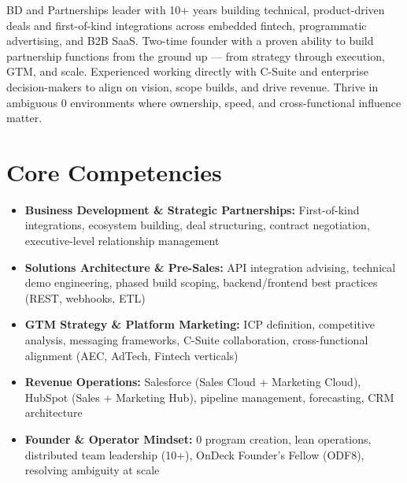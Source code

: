 \documentclass[11pt,a4paper,sans]{moderncv}
\begin{document}
\makecvtitle


\vspace{6pt}
\small{BD and Partnerships leader with 10+ years building technical, product-driven deals and first-of-kind integrations across embedded fintech, programmatic advertising, and B2B SaaS. Two-time founder with a proven ability to build partnership functions from the ground up — from strategy through execution, GTM, and scale. Experienced working directly with C-Suite and enterprise decision-makers to align on vision, scope builds, and drive revenue. Thrive in ambiguous 0 environments where ownership, speed, and cross-functional influence matter.}


\section{Core Competencies}
\vspace{1pt}
\begin{itemize}

\item \textbf{Business Development \& Strategic Partnerships:} First-of-kind integrations, ecosystem building, deal structuring, contract negotiation, executive-level relationship management
\vspace{1pt}

\item \textbf{Solutions Architecture \& Pre-Sales:} API integration advising, technical demo engineering, phased build scoping, backend/frontend best practices (REST, webhooks, ETL)
\vspace{1pt}

\item \textbf{GTM Strategy \& Platform Marketing:} ICP definition, competitive analysis, messaging frameworks, C-Suite collaboration, cross-functional alignment (AEC, AdTech, Fintech verticals)
\vspace{1pt}

\item \textbf{Revenue Operations:} Salesforce (Sales Cloud + Marketing Cloud), HubSpot (Sales + Marketing Hub), pipeline management, forecasting, CRM architecture
\vspace{1pt}

\item \textbf{Founder \& Operator Mindset:} 0 program creation, lean operations, distributed team leadership (10+), OnDeck Founder's Fellow (ODF8), resolving ambiguity at scale

\end{itemize}
\end{document}
